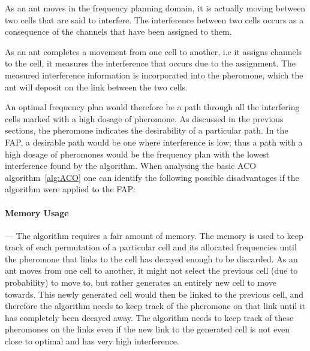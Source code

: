 As an ant moves in the frequency planning domain, it is actually moving between two cells that are said to interfere. The interference between two cells occurs as a consequence of the channels that have been assigned to them. 

As an ant completes a movement from one cell to another, i.e it assigns channels to the cell, it measures the interference that occurs due to the assignment.  The measured interference information is incorporated into the pheromone, which the ant will deposit on the link between the two cells.

An optimal frequency plan would therefore be a path through all the interfering cells marked with a high dosage of pheromone. As discussed in the previous sections, the pheromone indicates the desirability of a particular path. In the \gls{FAP}, a desirable path would be one where interference is low; thus a path with a high dosage of pheromones would be the frequency plan with the lowest interference found by the algorithm.
When analysing the basic \gls{ACO} algorithm~\ref{alg:ACO} one can identify the following possible disadvantages if the algorithm were applied to the \gls{FAP}:
\paragraph{Memory Usage}
--- The algorithm requires a fair amount of memory. The memory is used to keep track of each permutation of a particular cell and its allocated frequencies until the pheromone that links to the cell has decayed enough to be discarded. As an ant moves from one cell to another, it might not select the previous cell (due to probability) to move to, but rather generates an entirely new cell to move towards. This newly generated cell would then be linked to the previous cell, and therefore the algorithm needs to keep track of the pheromone on that link until it has completely been decayed away. The algorithm needs to keep track of these pheromones on the links even if the new link to the generated cell is not even close to optimal and has very high interference.

